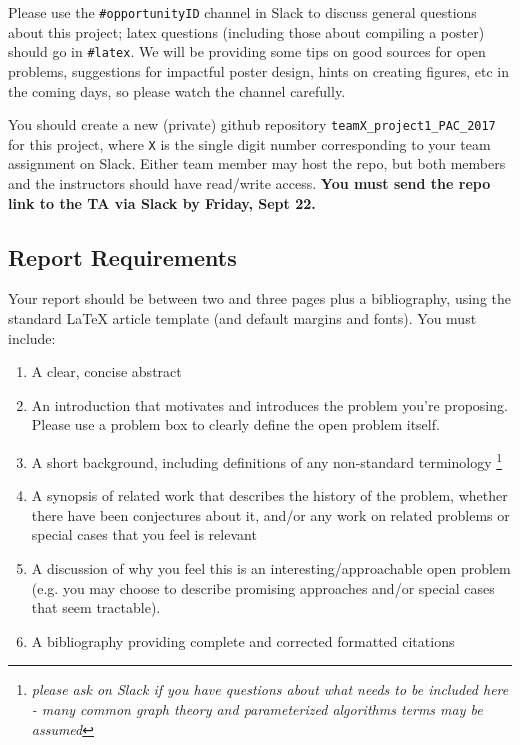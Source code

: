 \documentclass{article}
\begin{document}
Please use the \texttt{\#opportunityID} channel in Slack to discuss general questions
about this project; latex questions (including those about compiling a poster) should go
in \texttt{\#latex}. We will be providing some tips on good sources for open problems,
suggestions for impactful poster design, hints on creating figures, etc in the
coming days, so please watch the channel carefully.

\vspace{0.25in}

You should create a new (private) github repository \texttt{teamX\_project1\_PAC\_2017}
for this project, where \texttt{X}
is the single digit number corresponding to your team assignment on Slack.
Either team member may host the repo, but both members and the instructors
should have read/write access.
\textbf{You must send the repo link to the TA via Slack by Friday, Sept 22.}

\newpage
\subsection*{Report Requirements}

Your report should be between two and three pages plus a bibliography, using
the standard LaTeX article template (and default margins and fonts). You must include:
\begin{enumerate}
  \item A clear, concise abstract
  \item An introduction that motivates and introduces the problem you're proposing.
  Please use a problem box to clearly define the open problem itself.
  \item A short background, including definitions of any non-standard terminology
  \footnote{\emph{please ask on Slack if you have questions about what needs to be included here - many
  common graph theory and parameterized algorithms terms may be assumed}}
  \item A synopsis of related work that describes the history of the problem, whether
  there have been conjectures about it, and/or any work on related problems or special
  cases that you feel is relevant
  \item A discussion of why you feel this is an interesting/approachable open problem
  (e.g. you may choose to describe promising approaches and/or special cases that seem
  tractable).
  \item A bibliography providing complete and corrected formatted citations
\end{enumerate}
\end{document}
